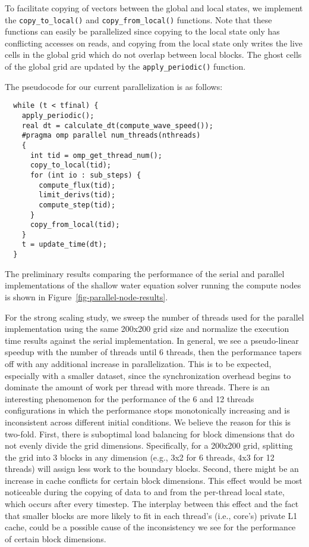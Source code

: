 To facilitate copying of vectors between the global and local states, we
implement the \texttt{copy\_to\_local()} and \texttt{copy\_from\_local()}
functions. Note that these functions can easily be parallelized since
copying to the local state only has conflicting accesses on reads, and
copying from the local state only writes the live cells in the global
grid which do not overlap between local blocks. The ghost cells of the
global grid are updated by the \texttt{apply\_periodic()} function.

The pseudocode for our current parallelization is as follows:

\begin{verbatim}
  while (t < tfinal) {
    apply_periodic();
    real dt = calculate_dt(compute_wave_speed());
    #pragma omp parallel num_threads(nthreads)
    {
      int tid = omp_get_thread_num();
      copy_to_local(tid);
      for (int io : sub_steps) {
        compute_flux(tid);
        limit_derivs(tid);
        compute_step(tid);
      }
      copy_from_local(tid);
    }
    t = update_time(dt);
  }
\end{verbatim}



The preliminary results comparing the performance of the serial and
parallel implementations of the shallow water equation solver running the
compute nodes is shown in Figure~\ref{fig-parallel-node-results}.

For the strong scaling study, we sweep the number of threads used for the
parallel implementation using the same 200x200 grid size and normalize
the execution time results against the serial implementation. In general,
we see a pseudo-linear speedup with the number of threads until 6
threads, then the performance tapers off with any additional increase in
parallelization. This is to be expected, especially with a smaller
dataset, since the synchronization overhead begins to dominate the amount
of work per thread with more threads. There is an interesting phenomenon
for the performance of the 6 and 12 threads configurations in which the
performance stops monotonically increasing and is inconsistent across
different initial conditions. We believe the reason for this is
two-fold. First, there is suboptimal load balancing for block dimensions
that do not evenly divide the grid dimensions. Specifically, for a
200x200 grid, splitting the grid into 3 blocks in any dimension (e.g.,
3x2 for 6 threads, 4x3 for 12 threads) will assign less work to the
boundary blocks. Second, there might be an increase in cache conflicts
for certain block dimensions. This effect would be most noticeable during
the copying of data to and from the per-thread local state, which occurs
after every timestep. The interplay between this effect and the fact that
smaller blocks are more likely to fit in each thread's (i.e., core's)
private L1 cache, could be a possible cause of the inconsistency we see
for the performance of certain block dimensions.

